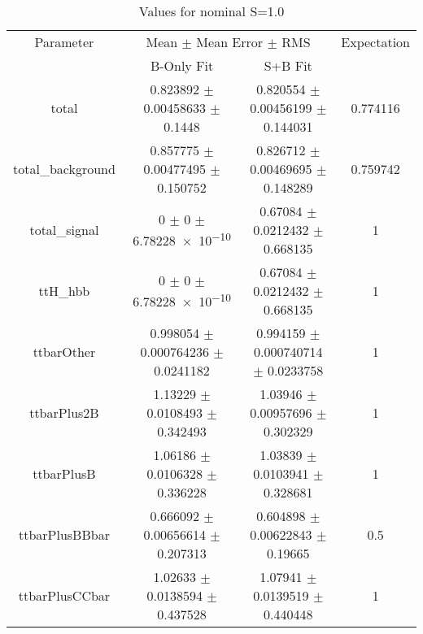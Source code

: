 \begin{table}
\centering
\caption{Values for nominal S=1.0}
\begin{tabular}{cccc}
\toprule
Parameter & \multicolumn{2}{c}{Mean $\pm$ Mean Error $\pm$ RMS} & Expectation\\
 & B-Only Fit & S+B Fit & \\
\midrule
total & \num{0.823892} $\pm$ \num{0.00458633} $\pm$ \num{0.1448} & \num{0.820554} $\pm$ \num{0.00456199} $\pm$ \num{0.144031} & \num{0.774116}\\
total\_background & \num{0.857775} $\pm$ \num{0.00477495} $\pm$ \num{0.150752} & \num{0.826712} $\pm$ \num{0.00469695} $\pm$ \num{0.148289} & \num{0.759742}\\
total\_signal & \num{0} $\pm$ \num{0} $\pm$ \num{6.78228e-10} & \num{0.67084} $\pm$ \num{0.0212432} $\pm$ \num{0.668135} & \num{1}\\
ttH\_hbb & \num{0} $\pm$ \num{0} $\pm$ \num{6.78228e-10} & \num{0.67084} $\pm$ \num{0.0212432} $\pm$ \num{0.668135} & \num{1}\\
ttbarOther & \num{0.998054} $\pm$ \num{0.000764236} $\pm$ \num{0.0241182} & \num{0.994159} $\pm$ \num{0.000740714} $\pm$ \num{0.0233758} & \num{1}\\
ttbarPlus2B & \num{1.13229} $\pm$ \num{0.0108493} $\pm$ \num{0.342493} & \num{1.03946} $\pm$ \num{0.00957696} $\pm$ \num{0.302329} & \num{1}\\
ttbarPlusB & \num{1.06186} $\pm$ \num{0.0106328} $\pm$ \num{0.336228} & \num{1.03839} $\pm$ \num{0.0103941} $\pm$ \num{0.328681} & \num{1}\\
ttbarPlusBBbar & \num{0.666092} $\pm$ \num{0.00656614} $\pm$ \num{0.207313} & \num{0.604898} $\pm$ \num{0.00622843} $\pm$ \num{0.19665} & \num{0.5}\\
ttbarPlusCCbar & \num{1.02633} $\pm$ \num{0.0138594} $\pm$ \num{0.437528} & \num{1.07941} $\pm$ \num{0.0139519} $\pm$ \num{0.440448} & \num{1}\\
\bottomrule
\end{tabular}
\end{table}